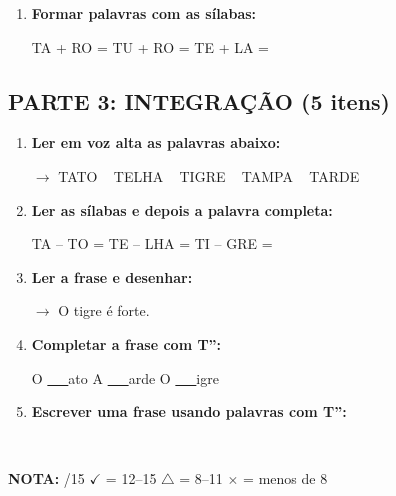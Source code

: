 \begin{exercicio}
\begin{enumerate}[resume]
  \item \textbf{Formar palavras com as sílabas:}
  \begin{center}
  TA + RO = \underline{\hspace{2cm}} \quad TU + RO = \underline{\hspace{2cm}} \quad TE + LA = \underline{\hspace{2cm}}
  \end{center}
\end{enumerate}

\subsection*{PARTE 3: INTEGRAÇÃO (5 itens)}

\begin{enumerate}[resume]
  \item \textbf{Ler em voz alta as palavras abaixo:}
  \begin{center}
  $\rightarrow$ TATO  ~  TELHA  ~  TIGRE  ~  TAMPA  ~  TARDE
  \end{center}

  \item \textbf{Ler as sílabas e depois a palavra completa:}
  \begin{center}
  TA -- TO = \underline{\hspace{2cm}} \quad TE -- LHA = \underline{\hspace{2cm}} \quad TI -- GRE = \underline{\hspace{2cm}}
  \end{center}

  \item \textbf{Ler a frase e desenhar:}
  \begin{center}
  $\rightarrow$ O tigre é forte.
  \end{center}
  \begin{center}
  \end{center}

  \item \textbf{Completar a frase com T'':}
  \begin{center}
  O \underline{~~~}ato \quad A \underline{~~~}arde \quad O \underline{~~~}igre
  \end{center}

  \item \textbf{Escrever uma frase usando palavras com T'':}
  \begin{center}
  \underline{\hspace{12cm}} \\
  \underline{\hspace{12cm}}
  \end{center}
\end{enumerate}

\noindent\textbf{NOTA:} \underline{\hspace{1cm}}/15 \quad $\checkmark$ = 12--15 \quad $\triangle$ = 8--11 \quad $\times$ = menos de 8
\end{exercicio}

